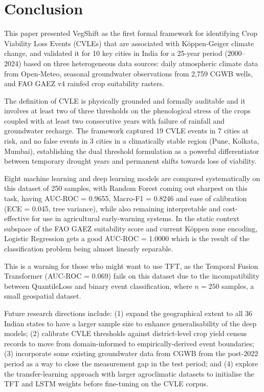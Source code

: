 \documentclass{ieeeaccess}
\begin{document}
\section{Conclusion}
\label{sec:conclusion}

This paper presented VegShift as the first formal framework for identifying Crop Viability Loss Events (CVLEs) that are associated with Köppen-Geiger climate change, and validated it for 10 key cities in India for a 25-year period (2000--2024) based on three heterogeneous data sources: daily atmospheric climate data from Open-Meteo, seasonal groundwater observations from 2,759 CGWB wells, and FAO GAEZ v4 rainfed crop suitability rasters.

The definition of CVLE is physically grounded and formally auditable and it involves at least two of three thresholds on the phenological stress of the crops coupled with at least two consecutive years with failure of rainfall and groundwater recharge. The framework captured 19 CVLE events in 7 cities at risk, and no false events in 3 cities in a climatically stable region (Pune, Kolkata, Mumbai), establishing the dual threshold formulation as a powerful differentiator between temporary drought years and permanent shifts towards loss of viability.

Eight machine learning and deep learning models are compared systematically on this dataset of 250 samples, with Random Forest coming out sharpest on this task, having AUC-ROC = 0.9655, Macro-F1 = 0.8246 and ease of calibration (ECE = 0.045, tree variance), while also remaining interpretable and cost-effective for use in agricultural early-warning systems. In the static context subspace of the FAO GAEZ suitability score and current Köppen zone encoding, Logistic Regression gets a good AUC-ROC = 1.0000 which is the result of the classification problem being almost linearly separable.

This is a warning for those who might want to use TFT, as the Temporal Fusion Transformer (AUC-ROC = 0.069) fails on this dataset due to the incompatibility between QuantileLoss and binary event classification, where $n = 250$ samples, a small geospatial dataset.

Future research directions include: (1) expand the geographical extent to all 36 Indian states to have a larger sample size to enhance generalisability of the deep models; (2) calibrate CVLE thresholds against district-level crop yield census records to move from domain-informed to empirically-derived event boundaries; (3) incorporate some existing groundwater data from CGWB from the post-2022 period as a way to close the measurement gap in the test period; and (4) explore the transfer-learning approach with larger agroclimatic datasets to initialise the TFT and LSTM weights before fine-tuning on the CVLE corpus.
\end{document}

